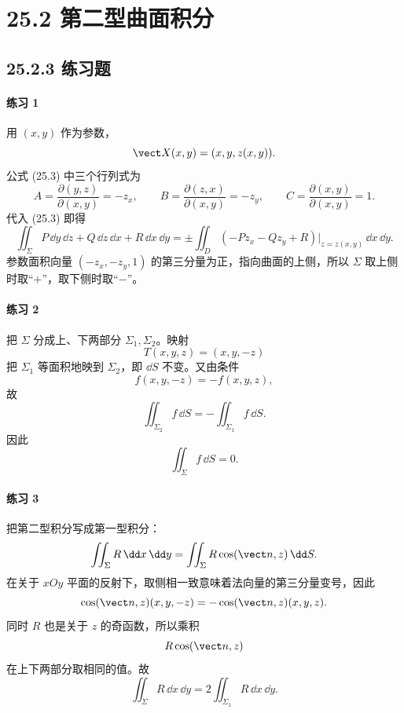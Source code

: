\section*{25.2 第二型曲面积分}

\subsection*{25.2.3 练习题}

\paragraph{练习 1}
\begin{xsolution}
用 $(x,y)$ 作为参数，
\[
  \vect X(x,y)=(x,y,z(x,y)).
\]
公式 (25.3) 中三个行列式为
\[
A=\frac{\partial(y,z)}{\partial(x,y)}=-z_x,
\qquad
B=\frac{\partial(z,x)}{\partial(x,y)}=-z_y,
\qquad
C=\frac{\partial(x,y)}{\partial(x,y)}=1.
\]
代入 (25.3) 即得
\[
  \iint_\Sigma P\,\dd y\,\dd z+Q\,\dd z\,\dd x+R\,\dd x\,\dd y
  =\pm\iint_D(-Pz_x-Qz_y+R)\big|_{z=z(x,y)}\,\dd x\,\dd y.
\]
参数面积向量 $(-z_x,-z_y,1)$ 的第三分量为正，指向曲面的上侧，所以 $\Sigma$ 取上侧时取“$+$”，取下侧时取“$-$”。
\end{xsolution}

\paragraph{练习 2}
\begin{xsolution}
把 $\Sigma$ 分成上、下两部分 $\Sigma_1,\Sigma_2$。映射
\[
  T(x,y,z)=(x,y,-z)
\]
把 $\Sigma_1$ 等面积地映到 $\Sigma_2$，即 $\dd S$ 不变。又由条件
\[
  f(x,y,-z)=-f(x,y,z),
\]
故
\[
  \iint_{\Sigma_2}f\,\dd S=-\iint_{\Sigma_1}f\,\dd S.
\]
因此
\[
  \boxed{\iint_\Sigma f\,\dd S=0}.
\]
\end{xsolution}

\paragraph{练习 3}
\begin{xsolution}
把第二型积分写成第一型积分：
\[
  \iint_\Sigma R\,\dd x\,\dd y
  =\iint_\Sigma R\cos(\vect n,z)\,\dd S.
\]
在关于 $xOy$ 平面的反射下，取侧相一致意味着法向量的第三分量变号，因此
\[
  \cos(\vect n,z)(x,y,-z)=-\cos(\vect n,z)(x,y,z).
\]
同时 $R$ 也是关于 $z$ 的奇函数，所以乘积
\[
  R\cos(\vect n,z)
\]
在上下两部分取相同的值。故
\[
  \boxed{
  \iint_\Sigma R\,\dd x\,\dd y
  =2\iint_{\Sigma_1}R\,\dd x\,\dd y}.
\]
\end{xsolution}

